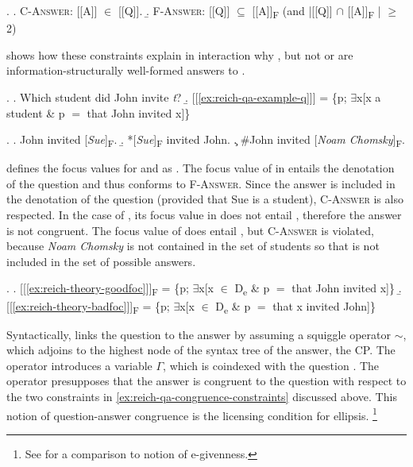 \ex. \a. \textsc{C-Answer}: [[A]] $\in$ [[Q]].\label{ex:reich-qa-congruence-constraints}
\b. \textsc{F-Answer}: [[Q]] $\subseteq$ [[A]]\textsubscript{F} (and |[[Q]] $\cap$ [[A]]\textsubscript{F} | $\geq$ 2)

\citeauthor{reich2007} shows how these constraints explain in interaction why \NNext[a], but not \NNext[b] or \NNext[c] are information-structurally well-formed answers to \Next. 

\ex. \a. Which student did John invite \textit{t}?\label{ex:reich-qa-example-q} \hfill \citep[472]{reich2007} 
\b. [[\ref{ex:reich-qa-example-q}]] = \{p; $\exists$x[x a student \& p $=$ that John invited x]\}

\ex. \a. John invited [\textit{Sue}]\textsubscript{F}.\label{ex:reich-theory-goodfoc} \hfill\citep[472]{reich2007}
\b. *[\textit{Sue}]\textsubscript{F} invited John.\label{ex:reich-theory-badfoc}
\c. \#John invited [\textit{Noam Chomsky}]\textsubscript{F}.\label{ex:reich-theory-badfoc-full}

\citet[472]{reich2007} defines the focus values for \Last[a] and \Last[b] as \Next. The focus value of \Last[a] in \Next[a] entails the denotation of the question \LLast[b] and thus conforms to \textsc{F-Answer}. Since the answer is included in the denotation of the question (provided that Sue is a student), \textsc{C-Answer} is also respected. In the case of \Last[b], its focus value in \Next[b] does not entail \LLast[b], therefore the answer is not congruent. The focus value of \Last[c] does entail \LLast[b], but \textsc{C-Answer} is violated, because \textit{Noam Chomsky} is not contained in the set of students so that \Last[c] is not included in the set of possible answers.

\ex. \a. [[\ref{ex:reich-theory-goodfoc}]]\textsubscript{F} = \{p; $\exists$x[x $\in$ D\textsubscript{e} \& p $=$ that John invited x]\}
\b. [[\ref{ex:reich-theory-badfoc}]]\textsubscript{F} = \{p; $\exists$x[x $\in$ D\textsubscript{e} \& p $=$ that x invited John]\}

Syntactically, \citet[472]{reich2007} links the question to the answer by assuming a squiggle operator $\sim$, which adjoins to the highest node of the syntax tree of the answer, the CP. The operator introduces a variable $\Gamma$, which is coindexed with the question \Next. The operator presupposes that the answer is congruent to the question with respect to the two constraints in \ref{ex:reich-qa-congruence-constraints} discussed above. This notion of question-answer congruence is the licensing condition for ellipsis.%
%
\footnote{See \citet[474--477]{reich2007} for a comparison to  notion of e-givenness.}\afterfn%

